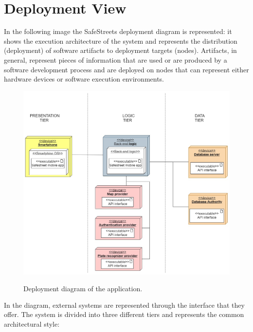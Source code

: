 \documentclass[../RASD.tex]{subfiles}
\begin{document}
    \section{Deployment View}\label{sec:deployment-view}
    In the following image the SafeStreets deployment diagram is represented: it shows the execution architecture of the system
    and represents the distribution (deployment) of software artifacts to deployment targets (nodes).
    Artifacts, in general, represent pieces of information that are used or are produced by a software development process and are deployed on nodes
    that can represent either hardware devices or software execution environments.
    \begin{figure}[H]
        \centering
        \includegraphics[scale = 1.6]{assets/deployment.png}\\[1.6 cm]
        \caption[\textit{Deployment} Diagram]{Deployment diagram of the application.}
    \end{figure}
    In the diagram, external systems are represented through the interface that they offer.
    The system is divided into three different tiers and represents the common architectural style:
\end{document}
